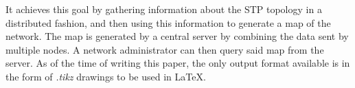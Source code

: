 It achieves this goal by gathering information about the STP topology in a distributed fashion, and then using this information to generate a map of the network.
The map is generated by a central server by combining the data sent by multiple nodes.
A network administrator can then query said map from the server.
As of the time of writing this paper, the only output format available is in the form of \textit{.tikz} drawings to be used in \LaTeX.
